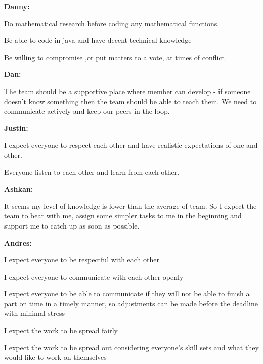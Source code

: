 \documentclass[a4paper]{article}
\begin{document}
\textbf{Danny:}
\begin{compactitem}
\item Do mathematical research before coding any mathematical functions.
\item Be able to code in java and have decent technical knowledge 
\item Be willing to compromise ,or put matters to a vote, at times of conflict
\end{compactitem}
\textbf{Dan: }
\begin{compactitem}
\item The team should be a supportive place where member can develop - if someone doesn’t know something then the team should be able to teach them. We need to communicate actively and keep our peers in the loop.
\end{compactitem}
\textbf{Justin:}
\begin{compactitem}
\item I expect everyone to respect each other and have realistic expectations of one and other.
\item Everyone listen to each other and learn from each other.
\end{compactitem}
\textbf{Ashkan:}
\begin{compactitem}
\item It seems my level of knowledge is lower than the average of team. So I expect the team to bear with me, assign some simpler tasks to me in the beginning and support me to catch up as soon as possible.
\end{compactitem}
\textbf{Andres:}
\begin{compactitem}
\item I expect everyone to be respectful with each other
\item I expect everyone to communicate with each other openly
\item I expect everyone to be able to communicate if they will not be able to finish a part on time in a timely manner, so adjustments can be made before the deadline with minimal stress
\item I expect the work to be spread fairly
\item I expect the work to be spread out considering everyone’s skill sets and what they would like to work on themselves
\end{compactitem}
\end{document}
